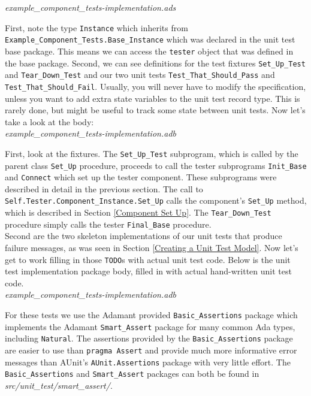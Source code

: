 \textit{example\_component\_tests-implementation.ads}

First, note the type \texttt{Instance} which inherits from \texttt{Example\_Component\_Tests.Base\_Instance} which was declared in the unit test base package. This means we can access the \texttt{tester} object that was defined in the base package. Second, we can see definitions for the test fixtures \texttt{Set\_Up\_Test} and \texttt{Tear\_Down\_Test} and our two unit tests \texttt{Test\_That\_Should\_Pass} and \texttt{Test\_That\_Should\_Fail}. Usually, you will never have to modify the specification, unless you want to add extra state variables to the unit test record type. This is rarely done, but might be useful to track some state between unit tests. Now let's take a look at the body: \\

\textit{example\_component\_tests-implementation.adb}

First, look at the fixtures. The \texttt{Set\_Up\_Test} subprogram, which is called by the parent class \texttt{Set\_Up} procedure, proceeds to call the tester subprograms \texttt{Init\_Base} and \texttt{Connect} which set up the tester component. These subprograms were described in detail in the previous section. The call to \texttt{Self.Tester.Component\_Instance.Set\_Up} calls the component's \texttt{Set\_Up} method, which is described in Section \ref{Component Set Up}. The \texttt{Tear\_Down\_Test} procedure simply calls the tester \texttt{Final\_Base} procedure. \\

Second are the two skeleton implementations of our unit tests that produce failure messages, as was seen in Section \ref{Creating a Unit Test Model}. Now let's get to work filling in those \texttt{TODO}s with actual unit test code. Below is the unit test implementation package body, filled in with actual hand-written unit test code. \\

\textit{example\_component\_tests-implementation.adb}

For these tests we use the Adamant provided \texttt{Basic\_Assertions} package which implements the Adamant \texttt{Smart\_Assert} package for many common Ada types, including \texttt{Natural}. The assertions provided by the \texttt{Basic\_Assertions} package are easier to use than \texttt{pragma Assert} and provide much more informative error messages than AUnit's \texttt{AUnit.Assertions} package with very little effort. The \texttt{Basic\_Assertions} and \texttt{Smart\_Assert} packages can both be found in \textit{src/unit\_test/smart\_assert/}. \\

